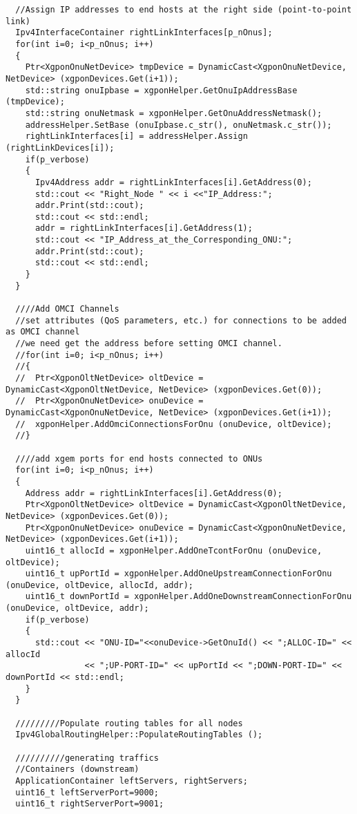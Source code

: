 \begin{lstlisting}
  //Assign IP addresses to end hosts at the right side (point-to-point link)
  Ipv4InterfaceContainer rightLinkInterfaces[p_nOnus];
  for(int i=0; i<p_nOnus; i++)
  {
    Ptr<XgponOnuNetDevice> tmpDevice = DynamicCast<XgponOnuNetDevice, NetDevice> (xgponDevices.Get(i+1));
    std::string onuIpbase = xgponHelper.GetOnuIpAddressBase (tmpDevice);
    std::string onuNetmask = xgponHelper.GetOnuAddressNetmask();
    addressHelper.SetBase (onuIpbase.c_str(), onuNetmask.c_str());
    rightLinkInterfaces[i] = addressHelper.Assign (rightLinkDevices[i]);
    if(p_verbose)
    {
      Ipv4Address addr = rightLinkInterfaces[i].GetAddress(0);
      std::cout << "Right_Node " << i <<"IP_Address:";
      addr.Print(std::cout);
      std::cout << std::endl;
      addr = rightLinkInterfaces[i].GetAddress(1);
      std::cout << "IP_Address_at_the_Corresponding_ONU:";
      addr.Print(std::cout);
      std::cout << std::endl;
    }
  }

  ////Add OMCI Channels
  //set attributes (QoS parameters, etc.) for connections to be added as OMCI channel
  //we need get the address before setting OMCI channel.
  //for(int i=0; i<p_nOnus; i++)
  //{
  //  Ptr<XgponOltNetDevice> oltDevice = DynamicCast<XgponOltNetDevice, NetDevice> (xgponDevices.Get(0));
  //  Ptr<XgponOnuNetDevice> onuDevice = DynamicCast<XgponOnuNetDevice, NetDevice> (xgponDevices.Get(i+1));
  //  xgponHelper.AddOmciConnectionsForOnu (onuDevice, oltDevice);
  //}

  ////add xgem ports for end hosts connected to ONUs
  for(int i=0; i<p_nOnus; i++)
  {
    Address addr = rightLinkInterfaces[i].GetAddress(0);
    Ptr<XgponOltNetDevice> oltDevice = DynamicCast<XgponOltNetDevice, NetDevice> (xgponDevices.Get(0));
    Ptr<XgponOnuNetDevice> onuDevice = DynamicCast<XgponOnuNetDevice, NetDevice> (xgponDevices.Get(i+1));
    uint16_t allocId = xgponHelper.AddOneTcontForOnu (onuDevice, oltDevice);
    uint16_t upPortId = xgponHelper.AddOneUpstreamConnectionForOnu (onuDevice, oltDevice, allocId, addr);
    uint16_t downPortId = xgponHelper.AddOneDownstreamConnectionForOnu (onuDevice, oltDevice, addr);
    if(p_verbose)
    {
      std::cout << "ONU-ID="<<onuDevice->GetOnuId() << ";ALLOC-ID=" << allocId
                << ";UP-PORT-ID=" << upPortId << ";DOWN-PORT-ID=" << downPortId << std::endl;
    }
  }

  /////////Populate routing tables for all nodes
  Ipv4GlobalRoutingHelper::PopulateRoutingTables ();

  //////////generating traffics
  //Containers (downstream)
  ApplicationContainer leftServers, rightServers;
  uint16_t leftServerPort=9000;
  uint16_t rightServerPort=9001;


\end{lstlisting}

